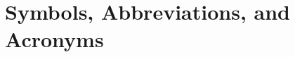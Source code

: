 \documentclass[12pt, titlepage]{article}
\begin{document}
%

\newpage

\tableofcontents

\listoftables

\newpage

\section{Symbols, Abbreviations, and Acronyms}
\end{document}
